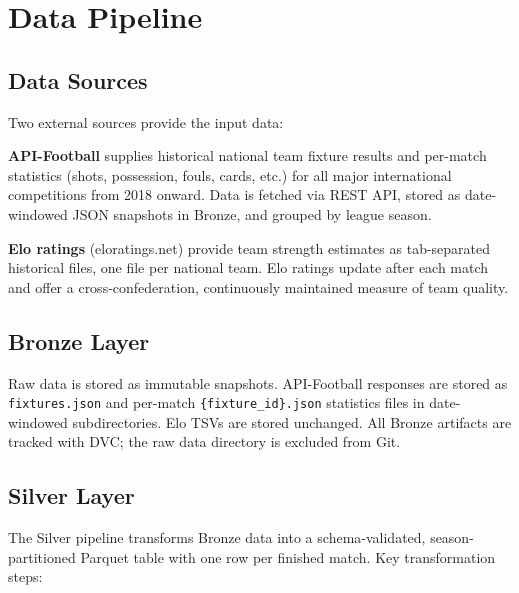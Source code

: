 \documentclass[conference]{IEEEtran}
\begin{document}
\section{Data Pipeline}
\label{sec:pipeline}

\subsection{Data Sources}

Two external sources provide the input data:

\textbf{API-Football} supplies historical national team fixture results and per-match
statistics (shots, possession, fouls, cards, etc.) for all major international competitions
from 2018 onward. Data is fetched via REST API, stored as date-windowed JSON snapshots in
Bronze, and grouped by league season.

\textbf{Elo ratings} (eloratings.net) provide team strength estimates as tab-separated
historical files, one file per national team. Elo ratings update after each match and offer
a cross-confederation, continuously maintained measure of team quality.

\subsection{Bronze Layer}

Raw data is stored as immutable snapshots. API-Football responses are stored as
\texttt{fixtures.json} and per-match \texttt{\{fixture\_id\}.json} statistics files
in date-windowed subdirectories. Elo TSVs are stored unchanged.
All Bronze artifacts are tracked with DVC; the raw data directory is excluded from Git.

\subsection{Silver Layer}

The Silver pipeline transforms Bronze data into a schema-validated, season-partitioned
Parquet table with one row per finished match. Key transformation steps:
\end{document}
